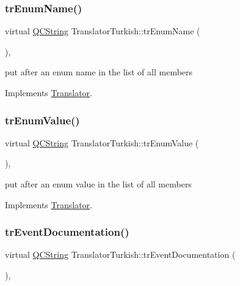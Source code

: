 \subsubsection{\texorpdfstring{trEnumName()}{trEnumName()}}
{\footnotesize\ttfamily virtual \mbox{\hyperlink{class_q_c_string}{Q\+C\+String}} Translator\+Turkish\+::tr\+Enum\+Name (\begin{DoxyParamCaption}{ }\end{DoxyParamCaption})\hspace{0.3cm}{\ttfamily [inline]}, {\ttfamily [virtual]}}

put after an enum name in the list of all members 

Implements \mbox{\hyperlink{class_translator}{Translator}}.

\mbox{\label{class_translator_turkish_a72f86f730449a34058569ab8cdb07f18}} 
\subsubsection{\texorpdfstring{trEnumValue()}{trEnumValue()}}
{\footnotesize\ttfamily virtual \mbox{\hyperlink{class_q_c_string}{Q\+C\+String}} Translator\+Turkish\+::tr\+Enum\+Value (\begin{DoxyParamCaption}{ }\end{DoxyParamCaption})\hspace{0.3cm}{\ttfamily [inline]}, {\ttfamily [virtual]}}

put after an enum value in the list of all members 

Implements \mbox{\hyperlink{class_translator}{Translator}}.

\mbox{\label{class_translator_turkish_aeaa57e52868588c82861ce248d7337bf}} 
\subsubsection{\texorpdfstring{trEventDocumentation()}{trEventDocumentation()}}
{\footnotesize\ttfamily virtual \mbox{\hyperlink{class_q_c_string}{Q\+C\+String}} Translator\+Turkish\+::tr\+Event\+Documentation (\begin{DoxyParamCaption}{ }\end{DoxyParamCaption})\hspace{0.3cm}{\ttfamily [inline]}, {\ttfamily [virtual]}}

